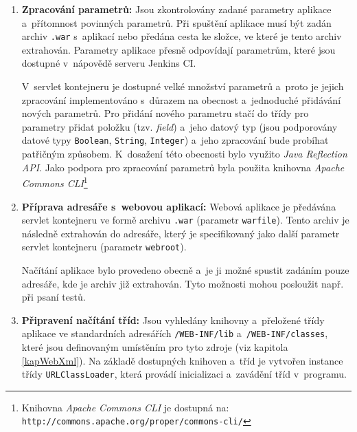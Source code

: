             \begin{enumerate}
                \item \textbf{Zpracování parametrů:} Jsou zkontrolovány zadané parametry
                    aplikace a~přítomnost povinných parametrů. Při spuštění aplikace
                    musí být zadán archiv \texttt{.war} s~aplikací nebo předána cesta
                    ke složce, ve které je tento archiv extrahován. 
                    Parametry aplikace
                    přesně odpovídají parametrům, které jsou dostupné v~nápovědě 
                    serveru Jenkins CI. 
                    
                    V~servlet kontejneru je dostupné velké množství parametrů
                    a~proto je jejich zpracování implementováno s~důrazem na obecnost a~jednoduché
                    přidávání nových parametrů. 
                    Pro přidání nového parametru stačí do třídy pro parametry přidat položku (tzv. \emph{field})
                    a~jeho datový typ (jsou podporovány datové typy \texttt{Boolean}, \texttt{String}, 
                    \texttt{Integer}) a~jeho zpracování bude probíhat patřičným
                    způsobem. K~dosažení této obecnosti bylo využito \emph{Java Reflection API}.
                    Jako podpora pro zpracování parametrů byla použita knihovna \emph{Apache
                    Commons CLI}\footnote{Knihovna \emph{Apache Commons CLI} je 
                    dostupná na: \texttt{http://commons.apache.org/proper/commons-cli/}}
                    
                \item \textbf{Příprava adresáře s~webovou aplikací:}  Webová aplikace
                    je předávána servlet kontejneru ve formě 
                    archivu \texttt{.war} (parametr \texttt{warfile}). Tento archiv je následně extrahován do 
                    adresáře, který je specifikovaný jako další parametr servlet kontejneru (parametr \texttt{webroot}).
                    
                    Načítání aplikace bylo provedeno obecně a~je ji možné spustit zadáním
                    pouze adresáře, kde je archiv již extrahován. Tyto možnosti mohou posloužit
                    např. při psaní testů.

                \item \textbf{Připravení načítání tříd:} Jsou vyhledány knihovny 
                    a~přeložené třídy aplikace ve standardních adresářích 
                    \texttt{/WEB-INF/lib} a~\texttt{/WEB-INF/classes}, které jsou definovaným
                    umístěním pro tyto zdroje (viz kapitola \ref{kapWebXml}). 
                    Na základě dostupných knihoven a~tříd je vytvořen instance třídy \texttt{URLClassLoader},
                    která provádí inicializaci a~zavádění tříd v~programu. 
                    

\end{enumerate}
